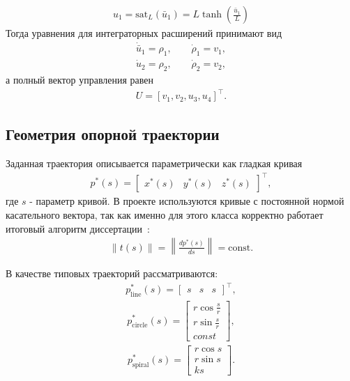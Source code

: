 \begin{gather}
    u_1 = \mathrm{sat}_L(\bar{u}_1) = L \tanh\left(\frac{\bar{u}_1}{L}\right)
\end{gather}
Тогда уравнения для интеграторных расширений принимают вид
\begin{gather}
    \dot{\bar{u}}_1 = \rho_1, \qquad \dot{\rho}_1 = v_1,
\end{gather}
\begin{gather}
    \dot{u}_2 = \rho_2, \qquad \dot{\rho}_2 = v_2,
\end{gather}
а полный вектор управления равен
\begin{gather}
    U = [v_1, v_2, u_3, u_4]^{\top}.
\end{gather}

\subsection{Геометрия опорной траектории}

Заданная траектория описывается параметрически как гладкая кривая
\begin{gather}
    p^{\ast}(s) = \begin{bmatrix} x^{\ast}(s) & y^{\ast}(s) & z^{\ast}(s) \end{bmatrix}^{\top},
\end{gather}
где $s$ - параметр кривой. В проекте используются кривые с постоянной нормой касательного вектора, так как именно для этого класса корректно работает итоговый алгоритм диссертации~\cite{kim_algorithms}:
\begin{gather}
    \|t(s)\| = \left\|\frac{d p^{\ast}(s)}{d s}\right\| = \mathrm{const}.
\end{gather}

В качестве типовых траекторий рассматриваются:
\begin{gather}
    p^{\ast}_{\text{line}}(s) = \begin{bmatrix} s & s & s \end{bmatrix}^{\top},
\end{gather}
\begin{gather}
    p^{\ast}_{\text{circle}}(s) =
    \begin{bmatrix}
        r \cos \frac{s}{r} \\
        r \sin \frac{s}{r} \\
        const
    \end{bmatrix},
\end{gather}
\begin{gather}
    p^{\ast}_{\text{spiral}}(s) =
    \begin{bmatrix}
        r \cos s \\
        r \sin s \\
        k s
    \end{bmatrix}.
\end{gather}


